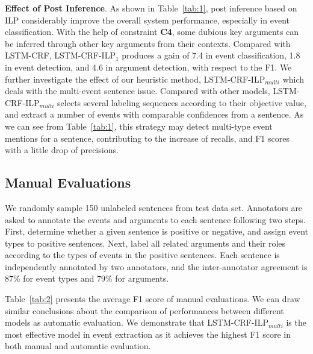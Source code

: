\documentclass{article}
\begin{document}
\vspace{1em}
\noindent \textbf{Effect of Post Inference}. As shown in Table~\ref{tab:1}, post inference based on ILP considerably improve the overall system performance, especially in event classification. With the help of constraint \textbf{C4},  some dubious key arguments can be inferred through other key arguments from their contexts. Compared with LSTM-CRF, LSTM-CRF-ILP$_1$ produces a gain of 7.4 in event classification, 1.8 in event detection, and 4.6 in argument detection, with respect to the F1. We further investigate the effect of our heuristic method, LSTM-CRF-ILP$_{multi}$ which deals with the multi-event sentence issue. Compared with other models, LSTM-CRF-ILP$_{multi}$ selects several labeling sequences according to their objective value, and extract a number of events with comparable confidences from a sentence. As we can see from Table~\ref{tab:1}, this strategy may detect multi-type event mentions for a sentence, contributing to the increase of recalls, and F1 scores with a little drop of precisions. 

\subsection{Manual Evaluations}
We randomly sample 150 unlabeled sentences from test data set. Annotators are asked to annotate the events and arguments to each sentence following two steps. First, determine whether a given sentence is positive or negative, and assign event types to positive sentences. Next, label all related arguments and their roles according to the types of events in the positive sentences. Each sentence is independently annotated by two annotators, and the inter-annotator agreement is 87\% for event types and 79\% for arguments.

Table~\ref{tab:2} presents the average F1 score of manual evaluations. We can draw similar conclusions about the comparison of performances between different models as automatic evaluation. We demonstrate that LSTM-CRF-ILP$_{multi}$ is the most effective model in event extraction as it achieves the highest F1 score in both manual and automatic evaluation.
\end{document}
